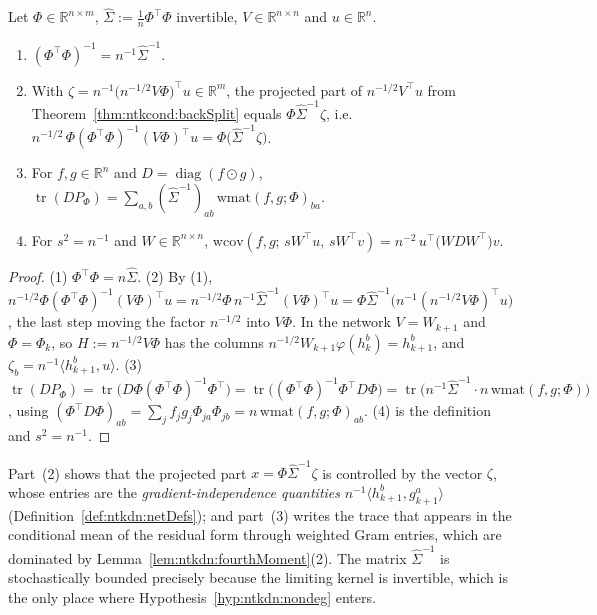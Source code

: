 \begin{lemma}\label{lem:ntkdn:projectedPart}
  \leanok
Let $\Phi\in\mathbb R^{n\times m}$, $\hat\Sigma:=\frac1n\Phi^\top\Phi$ invertible, $V\in\mathbb R^{n\times n}$ and $u\in\mathbb R^n$.
\begin{enumerate}
  \item $(\Phi^\top\Phi)^{-1}=n^{-1}\hat\Sigma^{-1}$.
  \item With $\zeta=n^{-1}\bigl(n^{-1/2}V\Phi\bigr)^\top u\in\mathbb R^m$, the projected part of $n^{-1/2}V^\top u$ from Theorem~\ref{thm:ntkcond:backSplit} equals $\Phi\hat\Sigma^{-1}\zeta$, i.e.
  $n^{-1/2}\,\Phi(\Phi^\top\Phi)^{-1}(V\Phi)^\top u=\Phi\bigl(\hat\Sigma^{-1}\zeta\bigr)$.
  \item For $f,g\in\mathbb R^n$ and $D=\operatorname{diag}(f\odot g)$, $\operatorname{tr}(DP_\Phi)=\sum_{a,b}(\hat\Sigma^{-1})_{ab}\,\mathrm{wmat}(f,g;\Phi)_{ba}$.
  \item For $s^2=n^{-1}$ and $W\in\mathbb R^{n\times n}$, $\mathrm{wcov}(f,g;\,sW^\top u,\,sW^\top v)=n^{-2}\,u^\top\bigl(WDW^\top\bigr)v$.
\end{enumerate}
\end{lemma}

\begin{proof}
  \leanok
(1) $\Phi^\top\Phi=n\hat\Sigma$. (2) By (1), $n^{-1/2}\Phi(\Phi^\top\Phi)^{-1}(V\Phi)^\top u=n^{-1/2}\Phi\,n^{-1}\hat\Sigma^{-1}(V\Phi)^\top u=\Phi\hat\Sigma^{-1}\bigl(n^{-1}(n^{-1/2}V\Phi)^\top u\bigr)$, the last step moving the factor $n^{-1/2}$ into $V\Phi$. In the network $V=W_{k+1}$ and $\Phi=\Phi_k$, so $H:=n^{-1/2}V\Phi$ has the columns $n^{-1/2}W_{k+1}\varphi(h_k^b)=h_{k+1}^b$, and $\zeta_b=n^{-1}\langle h_{k+1}^b,u\rangle$. (3) $\operatorname{tr}(DP_\Phi)=\operatorname{tr}\bigl(D\Phi(\Phi^\top\Phi)^{-1}\Phi^\top\bigr)=\operatorname{tr}\bigl((\Phi^\top\Phi)^{-1}\Phi^\top D\Phi\bigr)=\operatorname{tr}\bigl(n^{-1}\hat\Sigma^{-1}\cdot n\,\mathrm{wmat}(f,g;\Phi)\bigr)$, using $(\Phi^\top D\Phi)_{ab}=\sum_jf_jg_j\Phi_{ja}\Phi_{jb}=n\,\mathrm{wmat}(f,g;\Phi)_{ab}$. (4) is the definition and $s^2=n^{-1}$.
\end{proof}

\begin{remark}\label{rmk:ntkdn:projectedPartRemark}
Part~(2) shows that the projected part $x=\Phi\hat\Sigma^{-1}\zeta$ is controlled by the vector $\zeta$, whose entries are the \emph{gradient-independence quantities} $n^{-1}\langle h_{k+1}^b,g_{k+1}^a\rangle$ (Definition~\ref{def:ntkdn:netDefs}); and part~(3) writes the trace that appears in the conditional mean of the residual form through weighted Gram entries, which are dominated by Lemma~\ref{lem:ntkdn:fourthMoment}(2). The matrix $\hat\Sigma^{-1}$ is stochastically bounded precisely because the limiting kernel is invertible, which is the only place where Hypothesis~\ref{hyp:ntkdn:nondeg} enters.
\end{remark}


